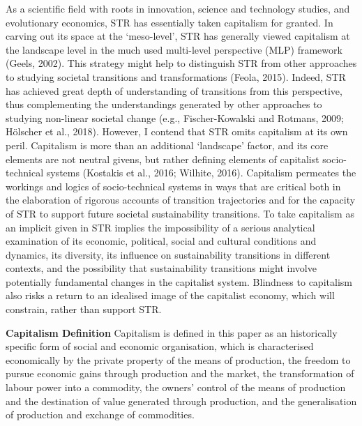 \documentclass[
]{book}
\begin{document}
As a scientific field with roots in innovation, science and technology studies, and evolutionary economics, STR has essentially
taken capitalism for granted. In carving out its space at the `meso-level', STR has generally viewed capitalism at the landscape level in
the much used multi-level perspective (MLP) framework (Geels, 2002). This strategy might help to distinguish STR from other
approaches to studying societal transitions and transformations (Feola, 2015). Indeed, STR has achieved great depth of understanding
of transitions from this perspective, thus complementing the understandings generated by other approaches to studying non-linear
societal change (e.g., Fischer-Kowalski and Rotmans, 2009; Hölscher et al., 2018).
However, I contend that STR omits capitalism at its own peril. Capitalism is more than an additional `landscape' factor, and its
core elements are not neutral givens, but rather defining elements of capitalist socio-technical systems (Kostakis et al., 2016; Wilhite,
2016). Capitalism permeates the workings and logics of socio-technical systems in ways that are critical both in the elaboration of
rigorous accounts of transition trajectories and for the capacity of STR to support future societal sustainability transitions. To take
capitalism as an implicit given in STR implies the impossibility of a serious analytical examination of its economic, political, social
and cultural conditions and dynamics, its diversity, its influence on sustainability transitions in different contexts, and the possibility
that sustainability transitions might involve potentially fundamental changes in the capitalist system. Blindness to capitalism also
risks a return to an idealised image of the capitalist economy, which will constrain, rather than support STR.

\textbf{Capitalism Definition}
Capitalism is defined in this paper as an historically specific form of social and economic organisation, which is characterised
economically by the private property of the means of production, the freedom to pursue economic gains through production and the
market, the transformation of labour power into a commodity, the owners' control of the means of production and the destination of
value generated through production, and the generalisation of production and exchange of commodities.
\end{document}
